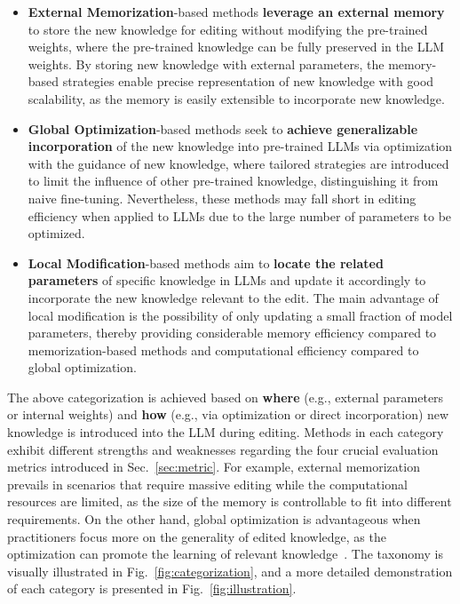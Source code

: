 \documentclass[acmsmall, screen]{acmart}
\begin{document}
\begin{itemize}[leftmargin=0.35cm]
    \item \textbf{External Memorization}-based methods \textbf{leverage an external memory} to store the new knowledge for editing without modifying the pre-trained weights, where the pre-trained knowledge can be fully preserved in the LLM weights. By storing new knowledge with external parameters, the memory-based strategies enable precise representation of new knowledge with good scalability, as the memory is easily extensible to incorporate new knowledge.

    \item \textbf{Global Optimization}-based methods seek to \textbf{achieve generalizable incorporation} of the new knowledge into pre-trained LLMs via optimization with the guidance of new knowledge, {where tailored strategies are introduced to limit the influence of other pre-trained knowledge}, distinguishing it from naive fine-tuning. Nevertheless, these methods may fall short in editing efficiency when applied to LLMs due to the large number of parameters to be optimized.

    \item \textbf{Local Modification}-based methods aim to \textbf{locate the related parameters} of specific knowledge in LLMs and update it accordingly to incorporate the new knowledge relevant to the edit. The main advantage of local modification is the possibility of only updating a small fraction of model parameters, {thereby providing considerable memory efficiency compared to memorization-based methods and computational efficiency compared to global optimization.} 
\end{itemize}
The above categorization is achieved based on \textbf{where} (e.g., external parameters or internal weights) and \textbf{how} (e.g., via optimization or direct incorporation) new knowledge is introduced into the LLM during editing. Methods in each category exhibit different strengths and weaknesses regarding the four crucial evaluation metrics introduced in Sec.~\ref{sec:metric}. For example, external memorization prevails in scenarios that require massive editing while the computational resources are limited, as the size of the memory is controllable to fit into different requirements. On the other hand, global optimization is advantageous when practitioners focus more on the generality of edited knowledge, as the optimization can promote the learning of relevant knowledge~\cite{aghajanyan-etal-2021-intrinsic}. The taxonomy is visually illustrated in Fig.~\ref{fig:categorization}, and a more detailed demonstration of each category is presented in Fig.~\ref{fig:illustration}. 
\end{document}
